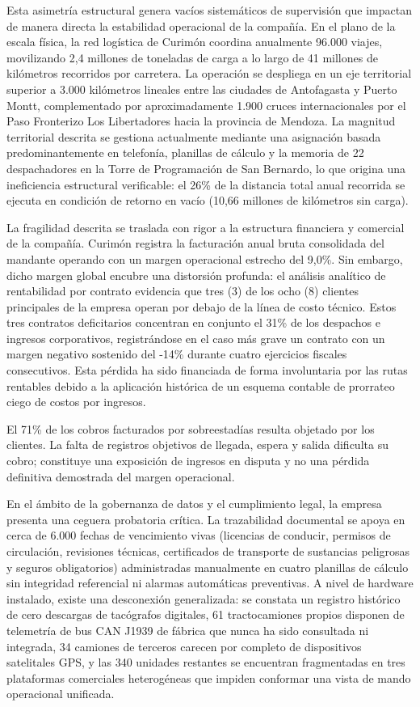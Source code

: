 Esta asimetría estructural genera vacíos sistemáticos de supervisión que impactan de manera directa la estabilidad operacional de la compañía. En el plano de la escala física, la red logística de Curimón coordina anualmente 96.000 viajes, movilizando 2,4 millones de toneladas de carga a lo largo de 41 millones de kilómetros recorridos por carretera. La operación se despliega en un eje territorial superior a 3.000 kilómetros lineales entre las ciudades de Antofagasta y Puerto Montt, complementado por aproximadamente 1.900 cruces internacionales por el Paso Fronterizo Los Libertadores hacia la provincia de Mendoza. La magnitud territorial descrita se gestiona actualmente mediante una asignación basada predominantemente en telefonía, planillas de cálculo y la memoria de 22 despachadores en la Torre de Programación de San Bernardo, lo que origina una ineficiencia estructural verificable: el 26\% de la distancia total anual recorrida se ejecuta en condición de retorno en vacío (10,66 millones de kilómetros sin carga).

La fragilidad descrita se traslada con rigor a la estructura financiera y comercial de la compañía. Curimón registra la facturación anual bruta consolidada del mandante operando con un margen operacional estrecho del 9,0\%. Sin embargo, dicho margen global encubre una distorsión profunda: el análisis analítico de rentabilidad por contrato evidencia que tres (3) de los ocho (8) clientes principales de la empresa operan por debajo de la línea de costo técnico. Estos tres contratos deficitarios concentran en conjunto el 31\% de los despachos e ingresos corporativos, registrándose en el caso más grave un contrato con un margen negativo sostenido del -14\% durante cuatro ejercicios fiscales consecutivos. Esta pérdida ha sido financiada de forma involuntaria por las rutas rentables debido a la aplicación histórica de un esquema contable de prorrateo ciego de costos por ingresos.

El 71\% de los cobros facturados por sobreestadías resulta objetado por los clientes. La falta de registros objetivos de llegada, espera y salida dificulta su cobro; constituye una exposición de ingresos en disputa y no una pérdida definitiva demostrada del margen operacional.

En el ámbito de la gobernanza de datos y el cumplimiento legal, la empresa presenta una ceguera probatoria crítica. La trazabilidad documental se apoya en cerca de 6.000 fechas de vencimiento vivas (licencias de conducir, permisos de circulación, revisiones técnicas, certificados de transporte de sustancias peligrosas y seguros obligatorios) administradas manualmente en cuatro planillas de cálculo sin integridad referencial ni alarmas automáticas preventivas. A nivel de hardware instalado, existe una desconexión generalizada: se constata un registro histórico de cero descargas de tacógrafos digitales, 61 tractocamiones propios disponen de telemetría de bus CAN J1939 de fábrica que nunca ha sido consultada ni integrada, 34 camiones de terceros carecen por completo de dispositivos satelitales GPS, y las 340 unidades restantes se encuentran fragmentadas en tres plataformas comerciales heterogéneas que impiden conformar una vista de mando operacional unificada.

